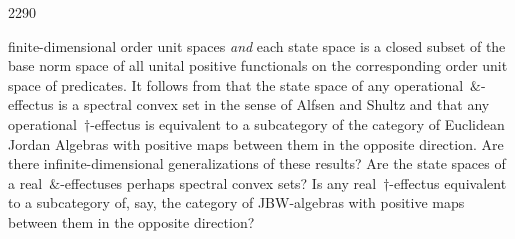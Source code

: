 \begin{parsec}{2290}
\begin{point}{10}
\begin{point}{30}
        finite-dimensional order unit spaces
        \emph{and} each state space is a closed subset
        of the base norm space of all
        unital positive functionals on the corresponding
        order unit space of predicates.
It follows from \cite{wetering}
    that the state space of any operational~$\&$-effectus
    is a spectral convex set in the sense of Alfsen and Shultz
    and that any operational~$\dagger$-effectus
    is equivalent to a subcategory of the category of Euclidean Jordan Algebras
    with positive maps between them in the opposite direction.
Are there infinite-dimensional generalizations of these results?
Are the state spaces of a real~$\&$-effectuses perhaps
    spectral convex sets?
Is any real~$\dagger$-effectus equivalent to a subcategory of, say,
    the category of JBW-algebras with positive maps between them
        in the opposite direction?
\end{point}
\end{point}
\end{parsec}


